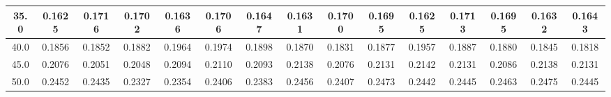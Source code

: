 \begin{table}[H]
{\begin{tabular}{|c|cccccccccccccc|}
35.0                                         & \multicolumn{1}{c|}{0.1625}            & \multicolumn{1}{c|}{0.1716}            & \multicolumn{1}{c|}{0.1702}            & \multicolumn{1}{c|}{0.1636}            & \multicolumn{1}{c|}{0.1706}            & \multicolumn{1}{c|}{0.1647}            & \multicolumn{1}{c|}{0.1631}            & \multicolumn{1}{c|}{0.1700}               & \multicolumn{1}{c|}{0.1695}            & \multicolumn{1}{c|}{0.1625}             & \multicolumn{1}{c|}{0.1713}             & \multicolumn{1}{c|}{0.1695}             & \multicolumn{1}{c|}{0.1632}             & 0.1643             \\ \hline
40.0                                         & \multicolumn{1}{c|}{0.1856}            & \multicolumn{1}{c|}{0.1852}            & \multicolumn{1}{c|}{0.1882}            & \multicolumn{1}{c|}{0.1964}            & \multicolumn{1}{c|}{0.1974}            & \multicolumn{1}{c|}{0.1898}            & \multicolumn{1}{c|}{0.1870}             & \multicolumn{1}{c|}{0.1831}            & \multicolumn{1}{c|}{0.1877}            & \multicolumn{1}{c|}{0.1957}             & \multicolumn{1}{c|}{0.1887}             & \multicolumn{1}{c|}{0.1880}              & \multicolumn{1}{c|}{0.1845}             & 0.1818             \\ \hline
45.0                                         & \multicolumn{1}{c|}{0.2076}            & \multicolumn{1}{c|}{0.2051}            & \multicolumn{1}{c|}{0.2048}            & \multicolumn{1}{c|}{0.2094}            & \multicolumn{1}{c|}{0.2110}             & \multicolumn{1}{c|}{0.2093}            & \multicolumn{1}{c|}{0.2138}            & \multicolumn{1}{c|}{0.2076}            & \multicolumn{1}{c|}{0.2131}            & \multicolumn{1}{c|}{0.2142}             & \multicolumn{1}{c|}{0.2131}             & \multicolumn{1}{c|}{0.2086}             & \multicolumn{1}{c|}{0.2138}             & 0.2131             \\ \hline
50.0                                         & \multicolumn{1}{c|}{0.2452}            & \multicolumn{1}{c|}{0.2435}            & \multicolumn{1}{c|}{0.2327}            & \multicolumn{1}{c|}{0.2354}            & \multicolumn{1}{c|}{0.2406}            & \multicolumn{1}{c|}{0.2383}            & \multicolumn{1}{c|}{0.2456}            & \multicolumn{1}{c|}{0.2407}            & \multicolumn{1}{c|}{0.2473}            & \multicolumn{1}{c|}{0.2442}             & \multicolumn{1}{c|}{0.2445}             & \multicolumn{1}{c|}{0.2463}             & \multicolumn{1}{c|}{0.2475}             & 0.2445             \\ \hline

\end{tabular}}
\end{table}
